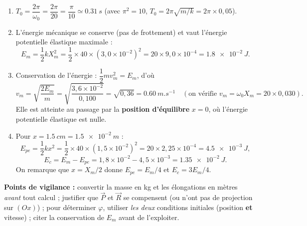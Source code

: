\documentclass[11pt]{article}
\begin{document}
\begin{corrige}
\begin{enumerate}
\[ \boxed{x(t) = 3{,}0\cos(20\,t)\ \text{(en cm, } t \text{ en s)}}. \]
\item $T_0 = \dfrac{2\pi}{\omega_0} = \dfrac{2\pi}{20} = \dfrac{\pi}{10} \simeq \SI{0,31}{s}$ (avec $\pi^2 = 10$, $T_0 = 2\pi\sqrt{m/k} = 2\pi\times 0{,}05$).
\item L'énergie mécanique se conserve (pas de frottement) et vaut l'énergie potentielle élastique maximale :
\[ E_m = \dfrac{1}{2}kX_m^2 = \dfrac{1}{2}\times 40\times (3{,}0\times 10^{-2})^2 = 20\times 9{,}0\times 10^{-4} = \SI{1,8e-2}{J}. \]
\item Conservation de l'énergie : $\dfrac{1}{2}mv_m^2 = E_m$, d'où
\[ v_m = \sqrt{\dfrac{2E_m}{m}} = \sqrt{\dfrac{3{,}6\times 10^{-2}}{0{,}100}} = \sqrt{0{,}36} = \SI{0,60}{m.s^{-1}} \quad (\text{on vérifie } v_m = \omega_0 X_m = 20\times 0{,}030). \]
Elle est atteinte au passage par la \textbf{position d'équilibre} $x = 0$, où l'énergie potentielle élastique est nulle.
\item Pour $x = \SI{1,5}{cm} = \SI{1,5e-2}{m}$ :
\[ E_{pe} = \dfrac{1}{2}kx^2 = \dfrac{1}{2}\times 40\times (1{,}5\times 10^{-2})^2 = 20\times 2{,}25\times 10^{-4} = \SI{4,5e-3}{J}, \]
\[ E_c = E_m - E_{pe} = 1{,}8\times 10^{-2} - 4{,}5\times 10^{-3} = \SI{1,35e-2}{J}. \]
On remarque que $x = X_m/2$ donne $E_{pe} = E_m/4$ et $E_c = 3E_m/4$.
\end{enumerate}
\textbf{Points de vigilance :} convertir la masse en kg et les élongations en mètres \emph{avant} tout calcul ; justifier que $\vec{P}$ et $\vec{R}$ se compensent (ou n'ont pas de projection sur $(Ox)$) ; pour déterminer $\varphi$, utiliser \emph{les deux} conditions initiales (position \textbf{et} vitesse) ; citer la conservation de $E_m$ avant de l'exploiter.
\end{corrige}
\end{document}
